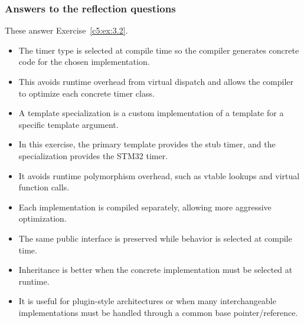 
\subsubsection{Answers to the reflection questions}
These answer Exercise~\ref{c5:ex:3.2}.

\begin{itemize}
  \item The timer type is selected at compile time so the compiler generates concrete code for the
    chosen implementation.
  \item This avoids runtime overhead from virtual dispatch and allows the compiler to optimize each
    concrete timer class.
\end{itemize}

\begin{itemize}
  \item A template specialization is a custom implementation of a template for a specific template
    argument.
  \item In this exercise, the primary  template provides the stub timer, and the
    specialization provides the STM32 timer.
\end{itemize}

\begin{itemize}
  \item It avoids runtime polymorphism overhead, such as vtable lookups and virtual function calls.
  \item Each implementation is compiled separately, allowing more aggressive optimization.
  \item The same public interface is preserved while behavior is selected at compile time.
\end{itemize}

\begin{itemize}
  \item Inheritance is better when the concrete implementation must be selected at runtime.
  \item It is useful for plugin-style architectures or when many interchangeable implementations
    must be handled through a common base pointer/reference.
\end{itemize}

